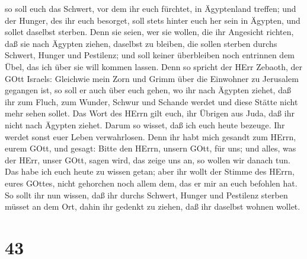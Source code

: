  so soll euch das Schwert, vor dem ihr euch fürchtet, in
Ägyptenland treffen; und der Hunger, des ihr euch besorget, soll stets
hinter euch her sein in Ägypten, und sollet daselbst sterben.
 Denn sie seien, wer sie wollen, die ihr Angesicht richten,
daß sie nach Ägypten ziehen, daselbst zu bleiben, die sollen sterben
durchs Schwert, Hunger und Pestilenz; und soll keiner überbleiben noch
entrinnen dem Übel, das ich über sie will kommen lassen. 
Denn so spricht der HErr Zebaoth, der GOtt Israels: Gleichwie mein Zorn
und Grimm über die Einwohner zu Jerusalem gegangen ist, so soll er auch
über euch gehen, wo ihr nach Ägypten ziehet, daß ihr zum Fluch, zum
Wunder, Schwur und Schande werdet und diese Stätte nicht mehr sehen
sollet.  Das Wort des HErrn gilt euch, ihr Übrigen aus
Juda, daß ihr nicht nach Ägypten ziehet. Darum so wisset, daß ich euch
heute bezeuge.  Ihr werdet sonst euer Leben verwahrlosen.
Denn ihr habt mich gesandt zum HErrn, eurem GOtt, und gesagt: Bitte den
HErrn, unsern GOtt, für uns; und alles, was der HErr, unser GOtt, sagen
wird, das zeige uns an, so wollen wir danach tun.  Das habe
ich euch heute zu wissen getan; aber ihr wollt der Stimme des HErrn,
eures GOttes, nicht gehorchen noch allem dem, das er mir an euch
befohlen hat.  So sollt ihr nun wissen, daß ihr durchs
Schwert, Hunger und Pestilenz sterben müsset an dem Ort, dahin ihr
gedenkt zu ziehen, daß ihr daselbst wohnen wollet.

\hypertarget{section-42}{%
\section{43}\label{section-42}}

